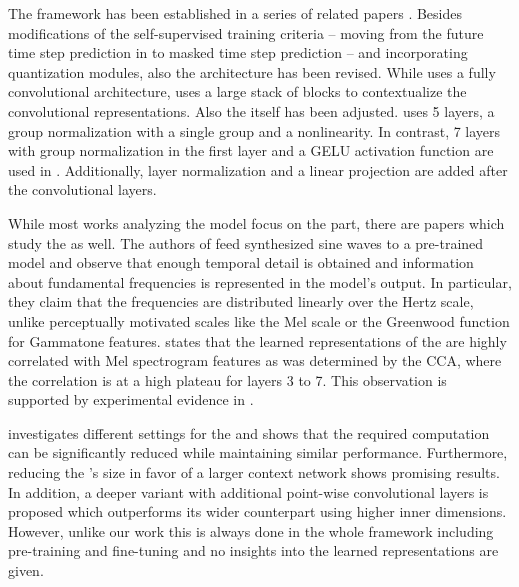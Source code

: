 \documentclass{INTERSPEECH2023}
\begin{document}
The \wv framework has been established in a series of related papers \cite{facebook2019wav2vec, facebook2019vqwav2vec, facebook2020wav2vec2, facebook2020xlsr}.
Besides modifications of the self-supervised training criteria -- moving from the future time step prediction in \cite{facebook2019wav2vec} to masked time step prediction -- and incorporating quantization modules, also the architecture has been revised.
While \cite{facebook2019wav2vec} uses a fully convolutional architecture, \cite{facebook2020wav2vec2} uses a large stack of \transformer blocks to contextualize the convolutional representations.
%
Also the \fe itself has been adjusted.
\cite{facebook2019wav2vec} uses 5 layers, a group normalization with a single group and a \relu nonlinearity.
In contrast, 7 layers with group normalization in the first layer and a GELU activation function are used in \cite{facebook2020wav2vec2}.
Additionally, layer normalization and a linear projection are added after the convolutional layers.

While most works analyzing the \wvtwo model focus on the \transformer part, there are papers which study the \fe as well.
The authors of \cite{choi2022w2v2fe} feed synthesized sine waves to a pre-trained model and observe that enough temporal detail is obtained and information about fundamental frequencies is represented in the model's output.
In particular, they claim that the frequencies are distributed linearly over the Hertz scale, unlike perceptually motivated scales like the Mel scale or the Greenwood function for Gammatone features.
\cite{livescu2021wav2vec_analysis} states that the learned representations of the \fe are highly correlated with Mel spectrogram features as was determined by the \gls{CCA}, where the correlation is at a high plateau for \fe layers 3 to 7.
This observation is supported by experimental evidence in \cite{dieck2022wav2vec}.

\cite{asapp2022performance} investigates different settings for the \wvtwo \fe and shows that the required computation can be significantly reduced while maintaining similar performance.
Furthermore, reducing the \fe's size in favor of a larger context network shows promising results.
In addition, a deeper variant with additional point-wise convolutional layers is proposed which outperforms its wider counterpart using higher inner dimensions.
However, unlike our work this is always done in the whole \wvtwo framework including pre-training and fine-tuning and no insights into the learned representations are given.
\end{document}
